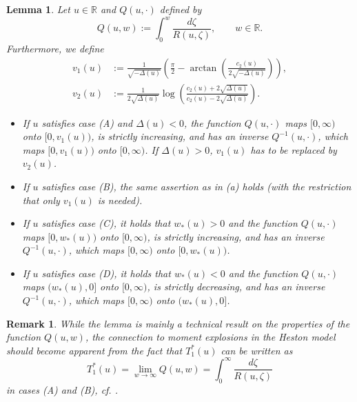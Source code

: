 \documentclass[12pt,a4paper]{amsart}
\numberwithin{equation}{section}
\numberwithin{equation}{section}
\newtheorem{remark}[theorem]{Remark}
\newtheorem{lemma}[theorem]{Lemma}
\theoremstyle{nonumberplain}
\newcommand{\RR}{\mathbb{R}}
\begin{document}
\begin{lemma}\label{lem_3.1}
	Let $u \in \RR$ and $Q(u,\cdot)$ defined by
	\begin{equation}\label{eq:Q1}
		Q(u,w) := \int_0^w \frac{d\zeta}{R(u,\zeta)}, \qquad w \in  \RR.
	\end{equation}
	Furthermore, we define
	\begin{align*}
		v_1(u) &:= \frac{1}{\sqrt{-\Delta(u)}}\left(\frac{\pi}{2} - \arctan \left(\frac{c_2(u)}{2\sqrt{-\Delta(u)}} \right) \right), \\
		v_2(u) &:= \frac{1}{2\sqrt{\Delta(u)}}\log \left( \frac{c_2(u) + 2 \sqrt{\Delta(u)} }{c_2(u) -2\sqrt{\Delta(u)}} \right).
	\end{align*}
	\begin{itemize}
\item[(a)] If $u$ satisfies case (A) and $\Delta(u)<0$, the function $ Q(u,\cdot)$ maps $[0,\infty)$ onto $[0,v_1(u))$, is strictly increasing, and has an inverse $ Q^{-1}(u,\cdot) $, which maps $[0,v_1(u))$ onto $[0,\infty)$. If $\Delta(u)>0$, $v_1(u)$ has to be replaced by $v_2(u)$.
\item[(b)] If $u$ satisfies case (B), the same assertion as in (a) holds (with the restriction that only $v_1(u)$ is needed).
\item[(c)] If $u$ satisfies case (C), it holds that $w_*(u)>0$ and the function $Q(u,\cdot)$ maps $[0,w_*(u))$ onto $[0,\infty)$, is strictly increasing, and has an inverse $ Q^{-1}(u,\cdot) $, which maps $[0,\infty)$ onto $[0,w_*(u))$.
\item[(d)] If $u$ satisfies case (D), it holds that $w_*(u)<0$ and the function $Q(u,\cdot)$ maps $(w_*(u),0]$ onto $[0,\infty)$, is strictly decreasing, and has an inverse $ Q^{-1}(u,\cdot) $, which maps $[0,\infty)$ onto $(w_*(u),0]$.
\end{itemize}
\end{lemma}
\begin{remark}
While the lemma is mainly a technical result on the properties of the function $Q(u,w)$, the connection to moment explosions in the Heston model should become apparent from the fact that $T_1^*(u)$ can be written as
\[T_1^*(u) = \lim_{w \to \infty} Q(u,w) = \int_0^\infty \frac{d\zeta}{R(u,\zeta)}\]
in cases (A) and (B), cf. \cite[Sec.~6.1]{keller-ressel2011moment}.
\end{remark}
\end{document}
